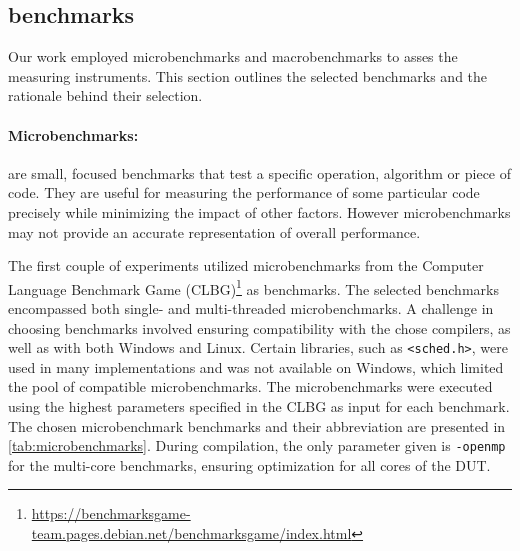 \subsection{benchmarks}\label{subsec:test_cases}

Our work employed microbenchmarks and macrobenchmarks to asses the measuring instruments. This section outlines the selected benchmarks and the rationale behind their selection.

\paragraph{Microbenchmarks:} are small, focused benchmarks that test a specific operation, algorithm or piece of code. They are useful for measuring the performance of some particular code precisely while minimizing the impact of other factors. However microbenchmarks may not provide an accurate representation of overall performance.\cite{MicroVSMacro}

The first couple of experiments utilized microbenchmarks from the Computer Language Benchmark Game (CLBG)\footnote{\url{https://benchmarksgame-team.pages.debian.net/benchmarksgame/index.html}} as benchmarks. The selected benchmarks encompassed both single- and multi-threaded microbenchmarks. A challenge in choosing benchmarks involved ensuring compatibility with the chose compilers, as well as with both Windows and Linux. Certain libraries, such as \texttt{<sched.h>}, were used in many implementations and was not available on Windows, which limited the pool of compatible microbenchmarks. The microbenchmarks were executed using the highest parameters specified in the CLBG as input for each benchmark. The chosen microbenchmark benchmarks and their abbreviation are presented in \cref{tab:microbenchmarks}. During compilation, the only parameter given is \texttt{-openmp} for the multi-core benchmarks, ensuring optimization for all cores of the DUT.



